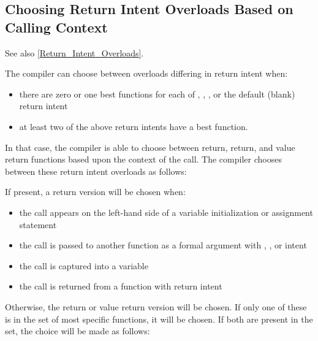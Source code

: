 \subsection{Choosing Return Intent Overloads Based on Calling Context}
\label{Choosing_Return_Intent_Overload}

See also \ref{Return_Intent_Overloads}.

The compiler can choose between overloads differing in return intent
when:

\begin{itemize}

\item there are zero or one best functions for each of ,
, , or the default (blank) return intent

\item at least two of the above return intents have a best function.

\end{itemize}

In that case, the compiler is able to choose between  return,
 return, and value return functions based upon the
context of the call. The compiler chooses between these return intent
overloads as follows:

If present, a  return version will be chosen when:

\begin{itemize}

\item the call appears on the left-hand side of a variable initialization
or assignment statement

\item the call is passed to another function as a formal argument with
, , or  intent

\item the call is captured into a  variable

\item the call is returned from a function with  return intent

\end{itemize}

Otherwise, the  return or value return version will be
chosen. If only one of these is in the set of most specific functions, it
will be chosen. If both are present in the set, the choice will be made
as follows:

